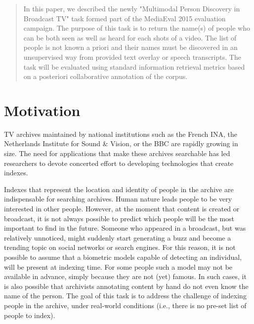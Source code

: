 \documentclass{acm_proc_article-me}
\begin{document}
\maketitle
\begin{abstract}
In this paper, we described the newly "Multimodal Person Discovery in Broadcast TV" task formed part of the MediaEval 2015 evaluation campaign. The purpose of this task is to return the name(s) of people who can be both seen as well as heard for each shots of a video. The list of people is not known a priori and their names must be discovered in an unsupervised way from provided text overlay or speech transcripts. The task will be evaluated using standard information retrieval metrics based on a posteriori collaborative annotation of the corpus.
\end{abstract}

\section{Motivation}

TV archives maintained by national institutions such as the French INA, the Netherlands Institute for Sound \& Vision, or the BBC are rapidly growing in size. The need for applications that make these archives searchable has led researchers to devote concerted effort to developing technologies that create indexes.

Indexes that represent the location and identity of people in the archive are indispensable for searching archives. Human nature leads people to be very interested in other people. However, at the moment that content is created or broadcast, it is not always possible to predict which people will be the most important to find in the future. Someone who appeared in a broadcast, but was relatively unnoticed, might suddenly start generating a buzz and become a trending topic on social networks or search engines. For this reason, it is not possible to assume that a biometric models capable of detecting an individual, will be present at indexing time. For some people such a model may not be available in advance, simply because they are not (yet) famous. In such cases, it is also possible that archivists annotating content by hand do not even know the name of the person. The goal of this task is to address the challenge of indexing people in the archive, under real-world conditions (i.e., there is no pre-set list of people to index). \\
\end{document}
